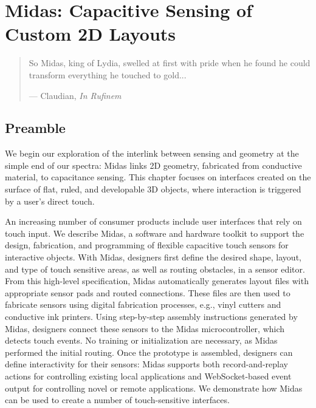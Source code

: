 \chapter{Midas: Capacitive Sensing of Custom 2D Layouts}

\begin{quote}
So Midas, king of Lydia, swelled at first with pride when he found he could transform everything he touched to gold...

--- Claudian, \emph{In Rufinem}
\end{quote}

\section{Preamble}

We begin our exploration of the interlink between sensing and geometry at the simple end of our spectra: Midas links 2D geometry, fabricated from conductive material, to capacitance sensing. This chapter focuses on interfaces created on the surface of flat, ruled, and developable 3D objects, where interaction is triggered by a user's direct touch.

An increasing number of consumer products include user interfaces that rely on touch input. We describe Midas, a software and hardware toolkit to support the design, fabrication, and programming of flexible capacitive touch sensors for interactive objects. With Midas, designers first define the desired shape, layout, and type of touch sensitive areas, as well as routing obstacles, in a sensor editor. From this high-level specification, Midas automatically generates layout files with appropriate sensor pads and routed connections. These files are then used to fabricate sensors using digital fabrication processes, e.g., vinyl cutters and conductive ink printers. Using step-by-step assembly instructions generated by Midas, designers connect these sensors to the Midas microcontroller, which detects touch events. No training or initialization are necessary, as Midas performed the initial routing. Once the prototype is assembled, designers can define interactivity for their sensors: Midas supports both record-and-replay actions for controlling existing local applications and WebSocket-based event output for controlling novel or remote applications.  We demonstrate how Midas can be used to create a number of touch-sensitive interfaces.

